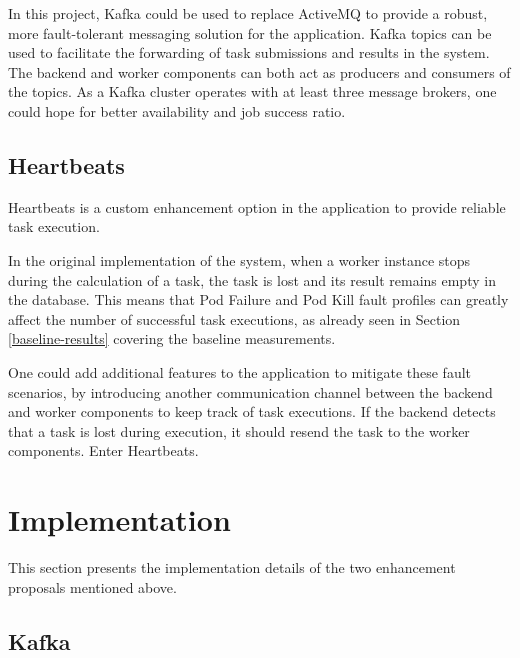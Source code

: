 In this project, Kafka could be used to replace ActiveMQ to provide a robust, more fault-tolerant messaging solution for the application. Kafka topics can be used to facilitate the forwarding of task submissions and results in the system. The backend and worker components can both act as producers and consumers of the topics. As a Kafka cluster operates with at least three message brokers, one could hope for better availability and job success ratio.

\subsection{Heartbeats}

Heartbeats is a custom enhancement option in the application to provide reliable task execution.

In the original implementation of the system, when a worker instance stops during the calculation of a task, the task is lost and its result remains empty in the database. This means that Pod Failure and Pod Kill fault profiles can greatly affect the number of successful task executions, as already seen in Section \ref{baseline-results} covering the baseline measurements.

One could add additional features to the application to mitigate these fault scenarios, by introducing another communication channel between the backend and worker components to keep track of task executions. If the backend detects that a task is lost during execution, it should resend the task to the worker components. Enter Heartbeats.

\section{Implementation} \label{enhancements-impl}

This section presents the implementation details of the two enhancement proposals mentioned above.

\subsection{Kafka}

